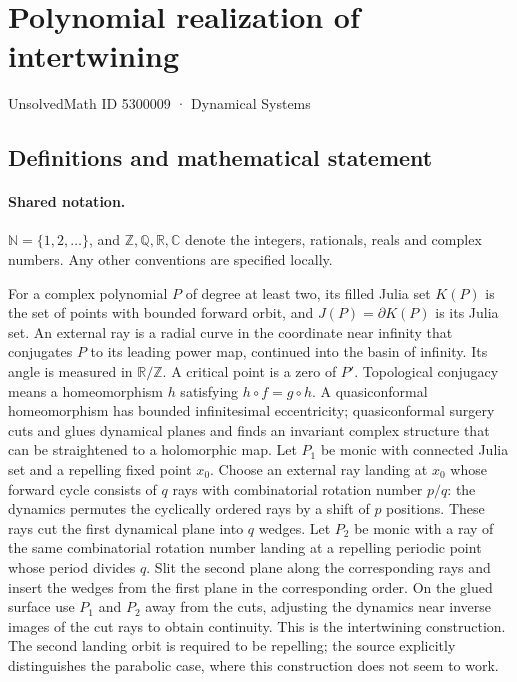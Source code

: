 \documentclass[11pt]{article}
\begin{document}
\setcounter{section}{5300008}
\section{Polynomial realization of intertwining}\label{5300009}
{\small\sffamily UnsolvedMath ID 5300009 · Dynamical Systems}
\subsection{Definitions and mathematical statement}

\paragraph{Shared notation.}$\mathbb N=\{1,2,\ldots\}$, and $\mathbb Z,\mathbb Q,\mathbb R,\mathbb C$ denote the integers, rationals, reals and complex numbers. Any other conventions are specified locally.


For a complex polynomial $P$ of degree at least two, its filled Julia set $K(P)$ is the set of points with bounded forward orbit, and $J(P)=\partial K(P)$ is its Julia set. An external ray is a radial curve in the coordinate near infinity that conjugates $P$ to its leading power map, continued into the basin of infinity. Its angle is measured in $\mathbb R/\mathbb Z$. A critical point is a zero of $P'$. Topological conjugacy means a homeomorphism $h$ satisfying $h\circ f=g\circ h$. A quasiconformal homeomorphism has bounded infinitesimal eccentricity; quasiconformal surgery cuts and glues dynamical planes and finds an invariant complex structure that can be straightened to a holomorphic map.
Let $P_1$ be monic with connected Julia set and a repelling fixed point $x_0$. Choose an external ray landing at $x_0$ whose forward cycle consists of $q$ rays with combinatorial rotation number $p/q$: the dynamics permutes the cyclically ordered rays by a shift of $p$ positions. These rays cut the first dynamical plane into $q$ wedges. Let $P_2$ be monic with a ray of the same combinatorial rotation number landing at a repelling periodic point whose period divides $q$. Slit the second plane along the corresponding rays and insert the wedges from the first plane in the corresponding order. On the glued surface use $P_1$ and $P_2$ away from the cuts, adjusting the dynamics near inverse images of the cut rays to obtain continuity. This is the intertwining construction. The second landing orbit is required to be repelling; the source explicitly distinguishes the parabolic case, where this construction does not seem to work.
\end{document}
